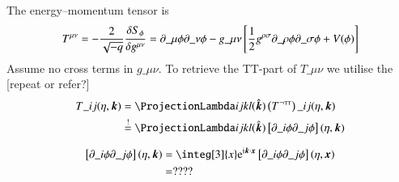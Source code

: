 

\begin{draft}
    \subsection{}
        The energy--momentum tensor is 
        \begin{equation}
            T\^{\mu\nu}= -\frac{2}{\sqrt{-q}}\frac{\delta S_\phi}{\delta g\^{\mu\nu}} = \partial\_\mu \phi \partial\_\nu \phi - g\_{\mu\nu}\bclosed{\frac{1}{2}g\^{\rho \sigma}\partial\_\rho  \phi \partial\_\sigma \phi + V(\phi) }
        \end{equation}
        \blahblah Assume no cross terms in $g\_{\mu\nu}$. To retrieve the TT-part of $T\_{\mu\nu}$ we utilise the [repeat or refer?]
        \begin{equation}
            \begin{split}
                T\_{ij}(\eta, \vec{k}) &= \Lam{ij}{kl}(\hat{\vec{k}}) \pclosed{T^{\lnot \text{{\tiny{TT}}}} }\_{ij}(\eta, \vec{k}) \\ %
                &\stackrel{!}{=} \Lam{ij}{kl}(\hat{\vec{k}}) \bclosed{\partial\_i \phi \partial\_j \phi }(\eta, \vec{k}) 
            \end{split}
        \end{equation}

        \begin{equation}
            \begin{split}
                \bclosed{\partial\_i \phi \partial\_j \phi }(\eta, \vec{k}) &= \integ[3]{x} \eu[\im \vec{k}\cdot \vec{x}] \bclosed{\partial\_i \phi  \partial\_j \phi }(\eta, \vec{x}) \\
                &= ????
            \end{split}
        \end{equation}




\end{draft}



